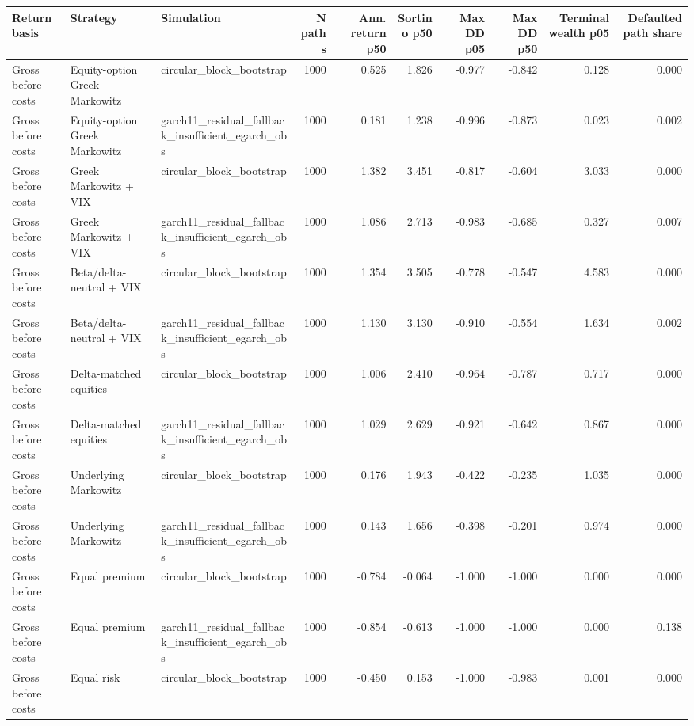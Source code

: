 \begin{tabular}{lllrrrrrrr}
\toprule
Return basis & Strategy & Simulation & N paths & Ann. return p50 & Sortino p50 & Max DD p05 & Max DD p50 & Terminal wealth p05 & Defaulted path share \\
\midrule
Gross before costs & Equity-option Greek Markowitz & circular\_block\_bootstrap & 1000 & 0.525 & 1.826 & -0.977 & -0.842 & 0.128 & 0.000 \\
Gross before costs & Equity-option Greek Markowitz & garch11\_residual\_fallback\_insufficient\_egarch\_obs & 1000 & 0.181 & 1.238 & -0.996 & -0.873 & 0.023 & 0.002 \\
Gross before costs & Greek Markowitz + VIX & circular\_block\_bootstrap & 1000 & 1.382 & 3.451 & -0.817 & -0.604 & 3.033 & 0.000 \\
Gross before costs & Greek Markowitz + VIX & garch11\_residual\_fallback\_insufficient\_egarch\_obs & 1000 & 1.086 & 2.713 & -0.983 & -0.685 & 0.327 & 0.007 \\
Gross before costs & Beta/delta-neutral + VIX & circular\_block\_bootstrap & 1000 & 1.354 & 3.505 & -0.778 & -0.547 & 4.583 & 0.000 \\
Gross before costs & Beta/delta-neutral + VIX & garch11\_residual\_fallback\_insufficient\_egarch\_obs & 1000 & 1.130 & 3.130 & -0.910 & -0.554 & 1.634 & 0.002 \\
Gross before costs & Delta-matched equities & circular\_block\_bootstrap & 1000 & 1.006 & 2.410 & -0.964 & -0.787 & 0.717 & 0.000 \\
Gross before costs & Delta-matched equities & garch11\_residual\_fallback\_insufficient\_egarch\_obs & 1000 & 1.029 & 2.629 & -0.921 & -0.642 & 0.867 & 0.000 \\
Gross before costs & Underlying Markowitz & circular\_block\_bootstrap & 1000 & 0.176 & 1.943 & -0.422 & -0.235 & 1.035 & 0.000 \\
Gross before costs & Underlying Markowitz & garch11\_residual\_fallback\_insufficient\_egarch\_obs & 1000 & 0.143 & 1.656 & -0.398 & -0.201 & 0.974 & 0.000 \\
Gross before costs & Equal premium & circular\_block\_bootstrap & 1000 & -0.784 & -0.064 & -1.000 & -1.000 & 0.000 & 0.000 \\
Gross before costs & Equal premium & garch11\_residual\_fallback\_insufficient\_egarch\_obs & 1000 & -0.854 & -0.613 & -1.000 & -1.000 & 0.000 & 0.138 \\
Gross before costs & Equal risk & circular\_block\_bootstrap & 1000 & -0.450 & 0.153 & -1.000 & -0.983 & 0.001 & 0.000 \\

\end{tabular}
